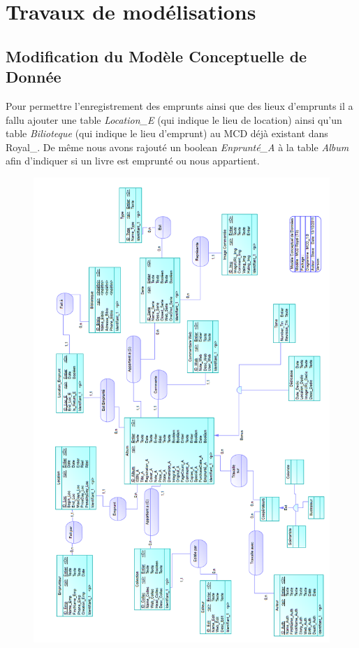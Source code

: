 \section{Travaux de modélisations} 
\subsection{Modification du Modèle Conceptuelle de Donnée}

Pour permettre l'enregistrement des emprunts ainsi que des lieux d'emprunts il a fallu ajouter une table \emph{Location\_E} (qui indique le lieu de location) ainsi qu'un table \emph{Bilioteque} (qui indique le lieu d'emprunt) au MCD déjà existant dans Royal\_.
De même nous avons rajouté un boolean \emph{Enprunté\_A} à la table \emph{Album} afin d'indiquer si un livre est emprunté ou nous appartient.

\begin{figure}[h!]
\begin{center}
\includegraphics[width=13cm]{MCD_Royal_Modif.png}
\end{center}
\end{figure}
\newpage{} 

